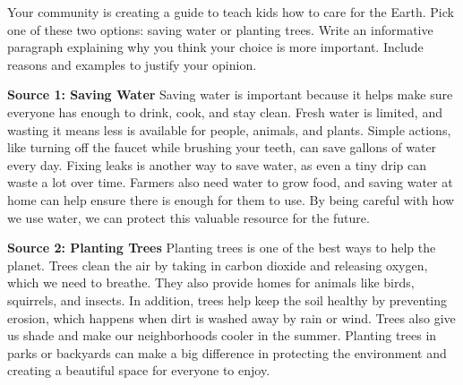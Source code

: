 \documentclass[12pt]{article}
\begin{document}
\begin{tcolorbox}[colframe=black!60, colback=white, 
coltitle=black, colbacktitle=black!15, fonttitle=\bfseries\Large, 
title=Independent Practice Prompt, halign title=center, left=10pt, right=10pt, top=10pt, bottom=15pt]
Your community is creating a guide to teach kids how to care for the Earth. Pick one of these two options: saving water or planting trees. Write an informative paragraph explaining why you think your choice is more important. Include reasons and examples to justify your opinion.


\vspace{1em}

\textbf{Source 1: Saving Water}
Saving water is important because it helps make sure everyone has enough to drink, cook, and stay clean. Fresh water is limited, and wasting it means less is available for people, animals, and plants. Simple actions, like turning off the faucet while brushing your teeth, can save gallons of water every day. Fixing leaks is another way to save water, as even a tiny drip can waste a lot over time. Farmers also need water to grow food, and saving water at home can help ensure there is enough for them to use. By being careful with how we use water, we can protect this valuable resource for the future.

\vspace{1em}

\textbf{Source 2: Planting Trees}
Planting trees is one of the best ways to help the planet. Trees clean the air by taking in carbon dioxide and releasing oxygen, which we need to breathe. They also provide homes for animals like birds, squirrels, and insects. In addition, trees help keep the soil healthy by preventing erosion, which happens when dirt is washed away by rain or wind. Trees also give us shade and make our neighborhoods cooler in the summer. Planting trees in parks or backyards can make a big difference in protecting the environment and creating a beautiful space for everyone to enjoy. 
\end{tcolorbox}

\vspace{1em}
\end{document}
